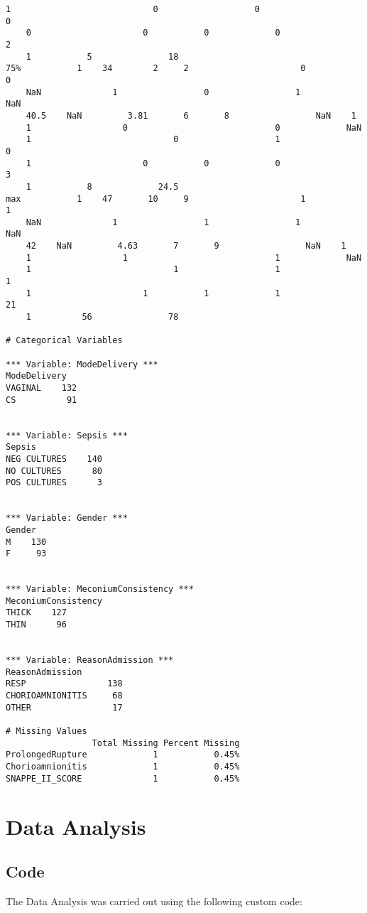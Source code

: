\documentclass[11pt]{article}
\begin{document}
\begin{Verbatim}[tabsize=4]
	1                            0                   0                           0
	0                      0           0             0                    2
	1           5               18
75%           1    34        2     2                      0                 0
	NaN              1                 0                 1           NaN
	40.5    NaN         3.81       6       8                 NaN    1
	1                  0                             0             NaN
	1                            0                   1                           0
	1                      0           0             0                    3
	1           8             24.5
max           1    47       10     9                      1                 1
	NaN              1                 1                 1           NaN
	42    NaN         4.63       7       9                 NaN    1
	1                  1                             1             NaN
	1                            1                   1                           1
	1                      1           1             1                   21
	1          56               78

# Categorical Variables

*** Variable: ModeDelivery ***
ModeDelivery
VAGINAL    132
CS          91


*** Variable: Sepsis ***
Sepsis
NEG CULTURES    140
NO CULTURES      80
POS CULTURES      3


*** Variable: Gender ***
Gender
M    130
F     93


*** Variable: MeconiumConsistency ***
MeconiumConsistency
THICK    127
THIN      96


*** Variable: ReasonAdmission ***
ReasonAdmission
RESP                138
CHORIOAMNIONITIS     68
OTHER                17

# Missing Values
                 Total Missing Percent Missing
ProlongedRupture             1           0.45%
Chorioamnionitis             1           0.45%
SNAPPE_II_SCORE              1           0.45%

\end{Verbatim}

\section{Data Analysis} \subsection{Code}The Data Analysis was carried out using the following custom code:
\end{document}
